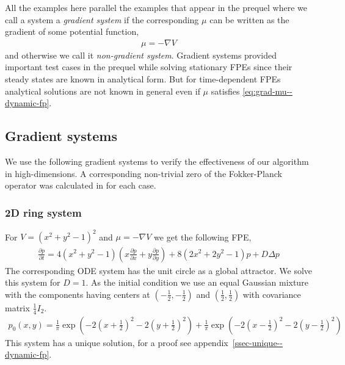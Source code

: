 All the examples here parallel the examples that appear in the prequel \cite{mandal2023learning} where we call a system a \textit{gradient system} if the corresponding $\mu$ can be written as the gradient of some potential function,
\begin{align}
    \mu=-\nabla V\label{eq:grad-mu--dynamic-fp}
\end{align}
and otherwise we call it \textit{non-gradient system}. Gradient systems provided important test cases in the prequel \cite{mandal2023learning} while solving stationary FPEs since their steady states are known in analytical form. But for time-dependent FPEs analytical solutions are not known in general even if $\mu$ satisfies \eqref{eq:grad-mu--dynamic-fp}. 

\subsection{Gradient systems} We use the following gradient systems to verify the effectiveness of our algorithm in high-dimensions. A corresponding non-trivial zero of the Fokker-Planck operator was calculated in \cite{mandal2023learning} for each case.
\subsubsection{2D ring system}\label{ssec-2D--dynamic-fp}
For $V=(x^2+y^2-1)^2$ and $\mu=-\nabla V$ we get the following FPE,
\begin{align}
     \frac{\partial p}{\partial t}=4(x^2+y^2-1)\left(x\frac{\partial p}{\partial x}+y\frac{\partial p}{\partial y}\right) + 8(2x^2+2y^2-1)p + D\Delta p\label{eq:ring2D--dynamic-fp}
\end{align}
The corresponding ODE system has the unit circle as a global attractor. We solve this system for $D=1$. As the initial condition we use an equal Gaussian mixture with the components having centers at $\left(-\frac{1}{2},-\frac{1}{2} \right)$ and $\left(\frac{1}{2},\frac{1}{2} \right)$ with covariance matrix $\frac{1}{4}I_2$.
\begin{align}
    p_0(x, y) = \frac{1}{\pi}\exp\left(-2\left(x+\frac{1}{2}\right)^2-2\left(y+\frac{1}{2}\right)^2\right)+\frac{1}{\pi}\exp\left(-2\left(x-\frac{1}{2}\right)^2-2\left(y-\frac{1}{2}\right)^2\right)\label{eq:p0-2D--dynamic-fp}
\end{align}
This system has a unique solution, for a proof see appendix~\ref{ssec-unique--dynamic-fp}.

